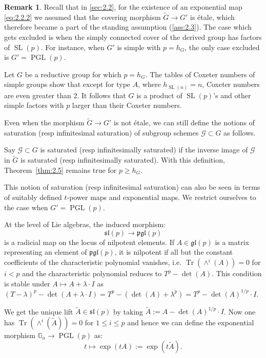 \documentclass[11pt,a4paper]{article}
\theoremstyle{plain}
\theoremstyle{definition}
\newtheorem{remark}[theorem]{Remark}
\DeclareMathOperator{\Tr}{Tr}
\DeclareMathOperator{\SL}{SL}
\DeclareMathOperator{\PGL}{PGL}
\newcommand{\G}{\mathbb{G}}
\begin{document}
\begin{remark} \label{rem:2.19}
Recall that in \ref{sec:2.2}, for the existence of an exponential map \eqref{eq:2.2.2} we assumed that the covering morphism $\tilde{G} \to G'$ is \'etale, which therefore became a part of the standing assumption (\ref{ass:2.3}). The case which gets excluded is when the simply connected cover of the derived group has factors of $\SL(p)$. For instance, when $G'$ is simple with $p = h_G$, the only case excluded is $G' = \PGL(p)$.

Let $G$ be a reductive group for which $p = h_G$. The tables of Coxeter numbers of simple groups show that except for type $A$, where $h_{\SL(n)} = n$, Coxeter numbers are even greater than $2$. It follows that $G$ is a product of $\SL(p)$'s and other simple factors with $p$ larger than their Coxeter numbers.

Even when the morphism $\tilde{G} \to G'$ is not \'etale, we can still define the notions of saturation (resp infinitesimal saturation) of subgroup schemes $\mathcal{G} \subset G$ as follows.

Say $\mathcal{G} \subset G$ is saturated (resp infinitesimally saturated) if the inverse image of $\mathcal{G}$ in $\tilde{G}$ is saturated (resp infinitesimally saturated). With this definition, Theorem~\ref{thm:2.5} remains true for $p \geq h_G$.

This notion of saturation (resp infinitesimal saturation) can also be seen in terms of suitably defined $t$-power maps and exponential maps. We restrict ourselves to the case when $G' = \PGL(p)$.

At the level of Lie algebras, the induced morphism:
\begin{equation} \label{eq:2.19.1}
\mathfrak{sl}(p) \to \mathfrak{pgl}(p)
\end{equation}
is a radicial map on the locus of nilpotent elements. If $A \in \mathfrak{gl}(p)$ is a matrix representing an element of $\mathfrak{pgl}(p)$, it is nilpotent if all but the constant coefficients of the characteristic polynomial vanishes, i.e. $\Tr(\wedge^i(A)) = 0$ for $i < p$ and the characteristic polynomial reduces to $T^p - \det(A)$. This condition is stable under $A \mapsto A + \lambda \cdot I$ as $(T - \lambda)^p - \det(A + \lambda \cdot I) = T^p - (\det(A) + \lambda^p) = T^p - \det(A)^{1/p} \cdot I$.

We get the unique lift $\tilde{A} \in \mathfrak{sl}(p)$ by taking $\tilde{A} := A - \det(A)^{1/p} \cdot I$. Now one has $\Tr(\wedge^i(\tilde{A})) = 0$ for $1 \leq i \leq p$ and hence we can define the exponential morphism $\G_a \to \PGL(p)$ as:
\begin{equation} \label{eq:2.19.2}
t \mapsto \exp(tA) := \exp(t\tilde{A}).
\end{equation}


\end{remark}
\end{document}
